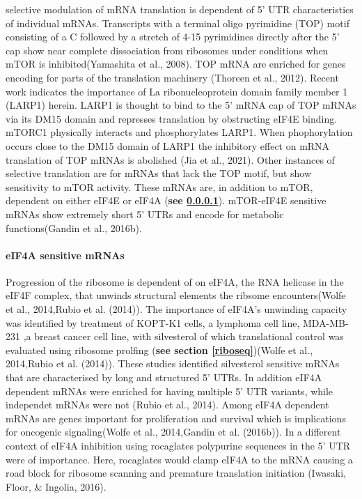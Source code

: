 \documentclass[12pt,openany]{book}
\begin{document}
selective modulation of mRNA translation is dependent of 5' UTR
characteristics of individual mRNAs. Transcripts with a terminal oligo
pyrimidine (TOP) motif consisting of a C followed by a stretch of 4-15
pyrimidines directly after the 5' cap show near complete dissociation
from ribosomes under conditions when mTOR is inhibited(Yamashita et al.,
2008). TOP mRNA are enriched for genes encoding for parts of the
translation machinery (Thoreen et al., 2012). Recent work indicates the
importance of La ribonucleoprotein domain family member 1 (LARP1)
herein. LARP1 is thought to bind to the 5' mRNA cap of TOP mRNAs via its
DM15 domain and represses translation by obstructing eIF4E binding.
mTORC1 physically interacts and phosphorylates LARP1. When
phophorylation occurs close to the DM15 domain of LARP1 the inhibitory
effect on mRNA translation of TOP mRNAs is abolished (Jia et al., 2021).
Other instances of selective translation are for mRNAs that lack the TOP
motif, but show sensitivity to mTOR activity. These mRNAs are, in
addition to mTOR, dependent on either eIF4E or eIF4A (\textbf{see
\ref{eif4a}}). mTOR-eIF4E sensitive mRNAs show extremely short 5' UTRs
and encode for metabolic functions(Gandin et al., 2016b).

\paragraph{eIF4A sensitive mRNAs} \label{eif4a}

Progression of the ribosome is dependent of on eIF4A, the RNA helicase
in the eIF4F complex, that unwinds structural elements the ribsome
encounters(Wolfe et al., 2014,Rubio et al. (2014)). The importance of
eIF4A's unwinding capacity was identified by treatment of KOPT-K1 cells,
a lymphoma cell line, MDA-MB-231 ,a breast cancer cell line, with
silvesterol of which translational control was evaluated using ribosome
prolfing (\textbf{see section \ref{riboseq}})(Wolfe et al., 2014,Rubio
et al. (2014)). These studies identified silvesterol sensitive mRNAs
that are characterised by long and structured 5' UTRs. In addition eIF4A
dependent mRNAs were enriched for having multiple 5' UTR variants, while
independet mRNAs were not (Rubio et al., 2014). Among eIF4A dependent
mRNAs are genes important for proliferation and survival which is
implications for oncogenic signaling(Wolfe et al., 2014,Gandin et al.
(2016b)). In a different context of eIF4A inhibition using rocaglates
polypurine sequences in the 5' UTR were of importance. Here, rocaglates
would clamp eIF4A to the mRNA causing a road block for ribosome scanning
and premature translation initiation (Iwasaki, Floor, \& Ingolia, 2016).
\end{document}
